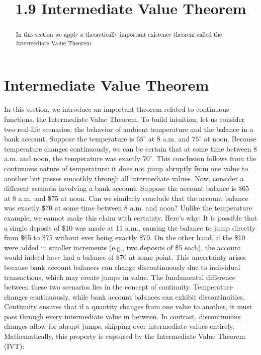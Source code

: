 \documentclass[handout]{ximera}
\title{1.9 Intermediate Value Theorem}
\begin{document}
\begin{abstract}
In this section we apply a theoretically important existence theorem called the Intermediate Value Theorem.
\end{abstract}

\maketitle

\section{Intermediate Value Theorem}


In this section, we introduce an important theorem related to continuous functions, the Intermediate Value Theorem. 
To build intuition, let us consider two real-life scenarios: the behavior of ambient temperature and the balance in a bank account.
Suppose the temperature is \(65^\circ\) at 8 a.m. and \(75^\circ\) at noon. Because temperature changes continuously, 
we can be certain that at some time between 8 a.m. and noon, the temperature was exactly \(70^\circ\). 
This conclusion follows from the continuous nature of temperature: it does not jump abruptly from one value to another but passes smoothly through all intermediate values.
Now, consider a different scenario involving a bank account. Suppose the account balance is \$65 at 8 a.m. and \$75 at noon. 
Can we similarly conclude that the account balance was exactly \$70 at some time between 8 a.m. and noon? Unlike the temperature example, we cannot make this claim with certainty. 
Here’s why: It is possible that a single deposit of \$10 was made at 11 a.m., causing the balance to jump directly from \$65 to \$75 without ever being exactly \$70. 
On the other hand, if the \$10 were added in smaller increments (e.g., two deposits of \$5 each), the account would indeed have had a balance of \$70 at some point. 
This uncertainty arises because bank account balances can change discontinuously due to individual transactions, which may create jumps in value.
The fundamental difference between these two scenarios lies in the concept of continuity. 
Temperature changes continuously, while bank account balances can exhibit discontinuities. 
Continuity ensures that if a quantity changes from one value to another, it must pass through every intermediate value in between. 
In contrast, discontinuous changes allow for abrupt jumps, skipping over intermediate values entirely.
Mathematically, this property is captured by the Intermediate Value Theorem (IVT):
\end{document}
